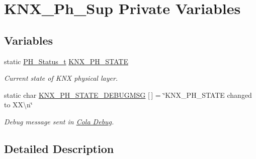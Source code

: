 \hypertarget{group___k_n_x___p_h___sup___private___variables}{}\section{K\+N\+X\+\_\+\+Ph\+\_\+\+Sup Private Variables}
\label{group___k_n_x___p_h___sup___private___variables}
\subsection*{Variables}
\begin{DoxyCompactItemize}
\item 
static \hyperlink{group___k_n_x___p_h___sup___exported___types_ga5b665a94bef912fbfbea7cc949ed0e49}{P\+H\+\_\+\+Status\+\_\+t} \hyperlink{group___k_n_x___p_h___sup___private___variables_gaed45956ede9586539568adc9994c6dfb}{K\+N\+X\+\_\+\+P\+H\+\_\+\+S\+T\+A\+TE}\hypertarget{group___k_n_x___p_h___sup___private___variables_gaed45956ede9586539568adc9994c6dfb}{}\label{group___k_n_x___p_h___sup___private___variables_gaed45956ede9586539568adc9994c6dfb}

\begin{DoxyCompactList}\small\item\em Current state of K\+NX physical layer. \end{DoxyCompactList}\item 
static char \hyperlink{group___k_n_x___p_h___sup___private___variables_ga00420d0a4e21ce2fc7f88cee0f6000b0}{K\+N\+X\+\_\+\+P\+H\+\_\+\+S\+T\+A\+T\+E\+\_\+\+D\+E\+B\+U\+G\+M\+SG} \mbox{[}$\,$\mbox{]} = \char`\"{}K\+N\+X\+\_\+\+P\+H\+\_\+\+S\+T\+A\+TE changed to X\+X\textbackslash{}n\char`\"{}\hypertarget{group___k_n_x___p_h___sup___private___variables_ga00420d0a4e21ce2fc7f88cee0f6000b0}{}\label{group___k_n_x___p_h___sup___private___variables_ga00420d0a4e21ce2fc7f88cee0f6000b0}

\begin{DoxyCompactList}\small\item\em Debug message sent in \hyperlink{group___cola___debug}{Cola Debug}. \end{DoxyCompactList}\end{DoxyCompactItemize}


\subsection{Detailed Description}
